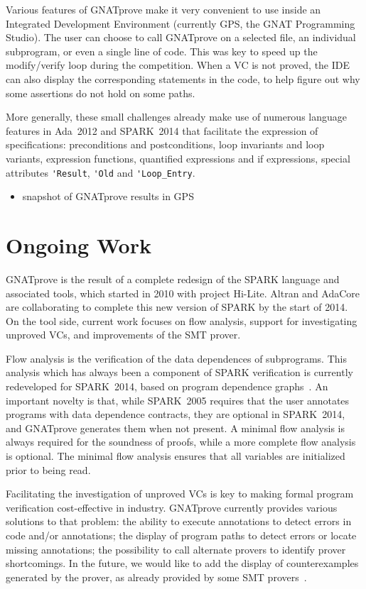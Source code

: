 \documentclass[sttt,draft]{svjour}
\newcommand{\hilite}{Hi-Lite}
\newcommand{\gnatprove}{GNATprove\xspace}
\newcommand{\oldspark}{SPARK~2005\xspace}
\newcommand{\newspark}{SPARK~2014\xspace}
\newcommand{\adatwtw}{Ada~2012\xspace}
\begin{document}
Various features of \gnatprove make it very convenient to use inside an
Integrated Development Environment (currently GPS, the GNAT Programming
Studio). The user can choose to call \gnatprove on a selected file, an
individual subprogram, or even a single line of code. This was key to speed up
the modify/verify loop during the competition. When a VC is not proved, the IDE
can also display the corresponding statements in the code, to help figure out
why some assertions do not hold on some paths.

More generally, these small challenges already make use of numerous language
features in \adatwtw and \newspark that facilitate the expression of
specifications: preconditions and postconditions, loop invariants and loop
variants, expression functions, quantified expressions and if expressions,
special attributes \verb|'Result|, \verb|'Old| and \verb|'Loop_Entry|.

\begin{itemize}
\item snapshot of GNATprove results in GPS
\end{itemize}

\section{Ongoing Work}
\label{ongoing}

\gnatprove is the result of a complete redesign of the SPARK language and
associated tools, which started in 2010 with project \hilite.\cite{Hi-Lite}
Altran and AdaCore are collaborating to complete this new version of SPARK by
the start of 2014. On the tool side, current work focuses on flow analysis,
support for investigating unproved VCs, and improvements of the SMT prover.

Flow analysis is the verification of the data dependences of subprograms. This
analysis which has always been a component of SPARK verification is currently
redeveloped for \newspark, based on program dependence
graphs~\cite{horwitz:1988:pldi}. An important novelty is that, while \oldspark
requires that the user annotates programs with data dependence contracts, they
are optional in \newspark, and \gnatprove generates them when not present. A
minimal flow analysis is always required for the soundness of proofs, while a
more complete flow analysis is optional. The minimal flow analysis ensures that
all variables are initialized prior to being read.

Facilitating the investigation of unproved VCs is key to making formal program
verification cost-effective in industry. \gnatprove currently provides various
solutions to that problem: the ability to execute annotations to detect errors
in code and/or annotations; the display of program paths to detect errors or
locate missing annotations; the possibility to call alternate provers to
identify prover shortcomings. In the future, we would like to add the display
of counterexamples generated by the prover, as already provided by some SMT
provers~\cite{CVC3,Z3model}.
\end{document}
